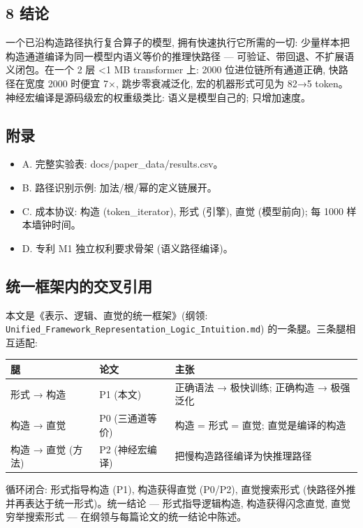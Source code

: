 \documentclass[
]{article}
\providecommand{\tightlist}{%
  \setlength{\itemsep}{0pt}\setlength{\parskip}{0pt}}
\begin{document}
\subsection{8 结论}\label{ux7ed3ux8bba}

一个已沿构造路径执行复合算子的模型, 拥有快速执行它所需的一切:
少量样本把构造通道编译为同一模型内语义等价的推理快路径 ---
可验证、带回退、不扩展语义闭包。在一个 2 层 \textless1 MB transformer
上: 2000 位进位链所有通道正确, 快路径在宽度 2000 时便宜 7×,
跳步零衰减泛化, 宏的机器形式可见为 82→5
token。神经宏编译是源码级宏的权重级类比: 语义是模型自己的; 只增加速度。

\subsection{附录}\label{ux9644ux5f55}

\begin{itemize}
\tightlist
\item
  A. 完整实验表: docs/paper\_data/results.csv。
\item
  B. 路径识别示例: 加法/根/幂的定义链展开。
\item
  C. 成本协议: 构造 (token\_iterator), 形式 (引擎), 直觉 (模型前向); 每
  1000 样本墙钟时间。
\item
  D. 专利 M1 独立权利要求骨架 (语义路径编译)。
\end{itemize}

\subsection{统一框架内的交叉引用}\label{ux7edfux4e00ux6846ux67b6ux5185ux7684ux4ea4ux53c9ux5f15ux7528}

本文是《表示、逻辑、直觉的统一框架》(纲领:
\texttt{Unified\_Framework\_Representation\_Logic\_Intuition.md})
的一条腿。三条腿相互适配:

\begin{longtable}[]{@{}lll@{}}
\toprule\noalign{}
腿 & 论文 & 主张 \\
\midrule\noalign{}
\endhead
\bottomrule\noalign{}
\endlastfoot
形式 → 构造 & P1 (本文) & 正确语法 → 极快训练; 正确构造 → 极强泛化 \\
构造 → 直觉 & P0 (三通道等价) & 构造 = 形式 = 直觉; 直觉是编译的构造 \\
构造 → 直觉 (方法) & P2 (神经宏编译) & 把慢构造路径编译为快推理路径 \\
\end{longtable}

循环闭合: 形式指导构造 (P1), 构造获得直觉 (P0/P2), 直觉搜索形式
(快路径外推并再表达于统一形式)。统一结论 --- 形式指导逻辑构造,
构造获得闪念直觉, 直觉穷举搜索形式 ---
在纲领与每篇论文的统一结论中陈述。
\end{document}
